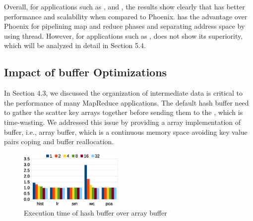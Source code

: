 





Overall, for applications such as ,  and , the results show clearly that \myds has better performance and scalability when compared to Phoenix.
\myds has the advantage over Phoenix for pipelining map and reduce phases and separating address space by using \myth thread. 
However, for applications such as , \myds does not show its superiority, which will be analyzed in detail in Section 5.4.

\subsection{Impact of buffer Optimizations}
In Section 4.3, we discussed the organization of intermediate data is critical to the performance of many MapReduce applications.
The default hash buffer need to gather the scatter key arrays together before sending them to the , which is time-wasting.
We addressed this issue by providing a array implementation of buffer, i.e., array buffer, which is a continuous memory space avoiding key value pairs coping and buffer reallocation.

\begin{figure}[!h!t]  
	\centering
	\includegraphics[width=0.45\textwidth]{eps/smr_diff_buffer.eps}
	\caption{Execution time of hash buffer over array buffer}
	\label{fig:smr:diff:buffer}
\end{figure}


